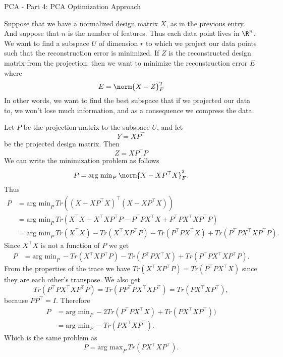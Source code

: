 \begin{entry}[1]{PCA - Part 4: PCA Optimization Approach}
\begin{entrysection} 
Suppose that we have a normalized design matrix $X$, as in the previous entry.
And suppose that $n$ is the number of features. Thus each data point lives in $\R^n$.
We want to find a subspace $U$ of dimension $r$ to which we project our data points such that the reconstruction error is minimized.
If $Z$ is the reconstructed design matrix from the projection, then we want to minimize the reconstruction error $E$ where 
\[ E = \norm{X - Z}_F^2  \] 
In other words, we want to find the best subspace that if we projected our data to, we won't lose much information, and as a consequence we compress the data.
\end{entrysection}

\begin{entrysection} 
Let $P$ be the projection matrix to the subspace $U$, and let \[Y = XP^{\top}\] be the projected design matrix. 
Then
\[ Z = XP^{\top}P\] 
We can write the minimization problem as follows
\[ P = \text{arg min}_P \: \norm{X - XP^{\top}X}_F^2. \]
Thus
\begin{align*}
P &= \text{arg min}_P \: Tr( (X - XP^{\top}X)^{\top} (X - XP^{\top}X) ) \\
&= \text{arg min}_P \: Tr( X^{\top}X - X^{\top}XP^{\top}P - P^{\top}PX^{\top}X + P^{\top}PX^{\top}XP^{\top}P ) \\  
&= \text{arg min}_P \: Tr( X^{\top}X ) - Tr (X^{\top}XP^{\top}P) - Tr(P^{\top}PX^{\top}X) + Tr(P^{\top}PX^{\top}XP^{\top}P ).
\end{align*}
Since $X^{\top}X$ is not a function of $P$ we get
\begin{align*}
P &= \text{arg min}_P \: - Tr (X^{\top}XP^{\top}P) - Tr(P^{\top}PX^{\top}X) + Tr(P^{\top}PX^{\top}XP^{\top}P ).
\end{align*}
From the properties of the trace we have $Tr (X^{\top}XP^{\top}P) = Tr(P^{\top}PX^{\top}X)$ since they are each other's transpose. We also get
\[ Tr(P^{\top}PX^{\top}XP^{\top}P) = Tr(PP^{\top}PX^{\top}XP^{\top}) = Tr(PX^{\top}XP^{\top}), \]
because $PP^{\top} = I$.
Therefore
\begin{align*}
P &= \text{arg min}_P \: - 2 Tr(P^{\top}PX^{\top}X) + Tr(PX^{\top}XP^{\top}) ) \\
&= \text{arg min}_P \: - Tr(PX^{\top}XP^{\top}) .
\end{align*}
Which is the same problem as
\[ P = \text{arg max}_P \: Tr(PX^{\top}XP^{\top}).
\]



\end{entrysection}

\end{entry}
